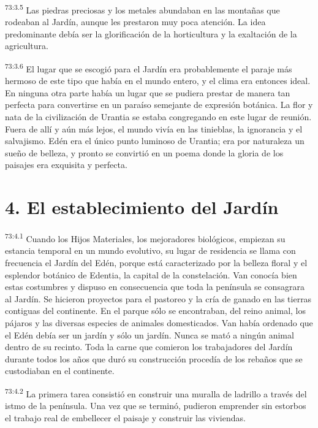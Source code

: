 \par
\textsuperscript{73:3.5} Las piedras preciosas y los metales abundaban en las montañas que rodeaban al Jardín, aunque les prestaron muy poca atención. La idea predominante debía ser la glorificación de la horticultura y la exaltación de la agricultura.

\par
\textsuperscript{73:3.6} El lugar que se escogió para el Jardín era probablemente el paraje más hermoso de este tipo que había en el mundo entero, y el clima era entonces ideal. En ninguna otra parte había un lugar que se pudiera prestar de manera tan perfecta para convertirse en un paraíso semejante de expresión botánica. La flor y nata de la civilización de Urantia se estaba congregando en este lugar de reunión. Fuera de allí y aún más lejos, el mundo vivía en las tinieblas, la ignorancia y el salvajismo. Edén era el único punto luminoso de Urantia; era por naturaleza un sueño de belleza, y pronto se convirtió en un poema donde la gloria de los paisajes era exquisita y perfecta.

\section*{4. El establecimiento del Jardín}
\par
\textsuperscript{73:4.1} Cuando los Hijos Materiales, los mejoradores biológicos, empiezan su estancia temporal en un mundo evolutivo, su lugar de residencia se llama con frecuencia el Jardín del Edén, porque está caracterizado por la belleza floral y el esplendor botánico de Edentia, la capital de la constelación. Van conocía bien estas costumbres y dispuso en consecuencia que toda la península se consagrara al Jardín. Se hicieron proyectos para el pastoreo y la cría de ganado en las tierras contiguas del continente. En el parque sólo se encontraban, del reino animal, los pájaros y las diversas especies de animales domesticados. Van había ordenado que el Edén debía ser un jardín y sólo un jardín. Nunca se mató a ningún animal dentro de su recinto. Toda la carne que comieron los trabajadores del Jardín durante todos los años que duró su construcción procedía de los rebaños que se custodiaban en el continente.

\par
\textsuperscript{73:4.2} La primera tarea consistió en construir una muralla de ladrillo a través del istmo de la península. Una vez que se terminó, pudieron emprender sin estorbos el trabajo real de embellecer el paisaje y construir las viviendas.

